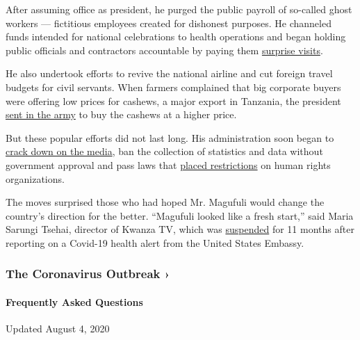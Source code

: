 After assuming office as president, he purged the public payroll of
so-called ghost workers --- fictitious employees created for dishonest
purposes. He channeled funds intended for national celebrations to
health operations and began holding public officials and contractors
accountable by paying them
\href{https://www.youtube.com/watch?v=4lDfz7s2HDQ}{surprise visits}.

He also undertook efforts to revive the national airline and cut foreign
travel budgets for civil servants. When farmers complained that big
corporate buyers were offering low prices for cashews, a major export in
Tanzania, the president
\href{https://www.bbc.com/news/world-africa-46180098}{sent in the army}
to buy the cashews at a higher price.

But these popular efforts did not last long. His administration soon
began to \href{https://cpj.org/africa/tanzania/}{crack down on the
media}, ban the collection of statistics and data without government
approval and pass laws that
\href{https://www.amnesty.org/en/latest/news/2019/06/tanzania-authorities-rushing-to-pass-bill-to-further-repress-human-rights/}{placed
restrictions} on human rights organizations.

The moves surprised those who had hoped Mr. Magufuli would change the
country's direction for the better. ``Magufuli looked like a fresh
start,'' said Maria Sarungi Tsehai, director of Kwanza TV, which was
\href{https://cpj.org/2020/07/tanzania-bans-kwanza-online-tv-for-11-months-citing-misleading-instagram-post-on-covid-19/}{suspended}
for 11 months after reporting on a Covid-19 health alert from the United
States Embassy.

\href{https://www.nytimes.com/news-event/coronavirus?action=click\&pgtype=Article\&state=default\&region=MAIN_CONTENT_3\&context=storylines_faq}{}

\hypertarget{the-coronavirus-outbreak-}{%
\subsubsection{The Coronavirus Outbreak
›}\label{the-coronavirus-outbreak-}}

\hypertarget{frequently-asked-questions}{%
\paragraph{Frequently Asked
Questions}\label{frequently-asked-questions}}

Updated August 4, 2020

